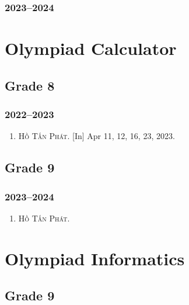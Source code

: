 \documentclass{article}
\begin{document}
\subsubsection{2023--2024}


\section{Olympiad Calculator}

\subsection{Grade 8}

\subsubsection{2022--2023}

\begin{enumerate}
	\item \textsc{Hồ Tấn Phát.} \textsf{[In]} Apr 11, 12, 16, 23, 2023.
\end{enumerate}


\subsection{Grade 9}

\subsubsection{2023--2024}

\begin{enumerate}
	\item \textsc{Hồ Tấn Phát.}
\end{enumerate}


\section{Olympiad Informatics}

\subsection{Grade 9}
\end{document}

